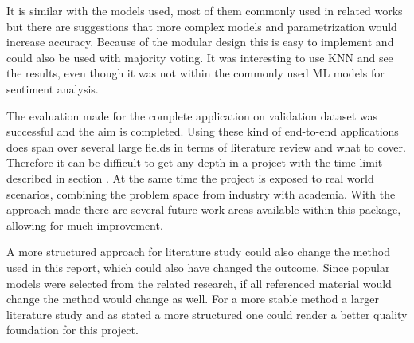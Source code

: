 It is similar with the models used, most of them commonly used in related works but there are suggestions that more complex models and parametrization would increase accuracy. 
Because of the modular design this is easy to implement and could also be used with majority voting. 
It was interesting to use KNN and see the results, even though it was not within the commonly used ML models for sentiment analysis. 


The evaluation made for the complete application on validation dataset was successful and the aim is completed. 
Using these kind of end-to-end applications does span over several large fields in terms of literature review and what to cover. 
Therefore it can be difficult to get any depth in a project with the time limit described in section . 
At the same time the project is exposed to real world scenarios, combining the problem space from industry with academia. 
With the approach made there are several future work areas available within this package, allowing for much improvement.


A more structured approach for literature study could also change the method used in this report, which could also have changed the outcome. 
Since popular models were selected from the related research, if all referenced material would change the method would change as well. 
For a more stable method a larger literature study and as stated a more structured one could render a better quality foundation for this project.